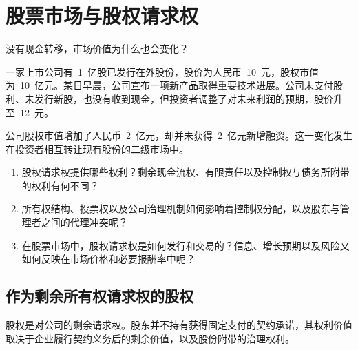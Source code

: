 \chapter{股票市场与股权请求权}
\label{chap:Stock_Markets_and_Equity_Claims}

\begin{openingcase}{没有现金转移，市场价值为什么也会变化？}

一家上市公司有~1~亿股已发行在外股份，股价为人民币~10~元，股权市值为~10~亿元。某日早晨，公司宣布一项新产品取得重要技术进展。公司未支付股利、未发行新股，也没有收到现金，但投资者调整了对未来利润的预期，股价升至~12~元。

公司股权市值增加了人民币~2~亿元，却并未获得~2~亿元新增融资。这一变化发生在投资者相互转让现有股份的二级市场中。

\end{openingcase}

\begin{tcolorbox}[
  enhanced,
  colback=FinanceBlue!6,
  colframe=FinanceBlue,
  boxrule=0.6pt,
  sharp corners,
  left=8pt,
  right=8pt,
  top=7pt,
  bottom=7pt,
  before skip=1em,
  after skip=1.6em,
  title=\textbf{核心问题},
  coltitle=white,
  colbacktitle=FinanceBlue,
  fonttitle=\bfseries,
  attach boxed title to top left={xshift=6pt,yshift=-2mm},
  boxed title style={
    boxrule=0pt,
    sharp corners,
    left=5pt,
    right=5pt,
    top=2pt,
    bottom=2pt
  }
]
\begin{enumerate}[
  leftmargin=*,
  label=\textcolor{FinanceBlue}{\textbf{\arabic*.}},
  itemsep=0.55em,
  topsep=0.2em
]

\item 股权请求权提供哪些权利？剩余现金流权、有限责任以及控制权与债务所附带的权利有何不同？

\item 所有权结构、投票权以及公司治理机制如何影响着控制权分配，以及股东与管理者之间的代理冲突呢？

\item 在股票市场中，股权请求权是如何发行和交易的？信息、增长预期以及风险又如何反映在市场价格和必要报酬率中呢？

\end{enumerate}
\end{tcolorbox}

\section{作为剩余所有权请求权的股权}

股权是对公司的剩余请求权。股东并不持有获得固定支付的契约承诺，其权利价值取决于企业履行契约义务后的剩余价值，以及股份附带的治理权利。

